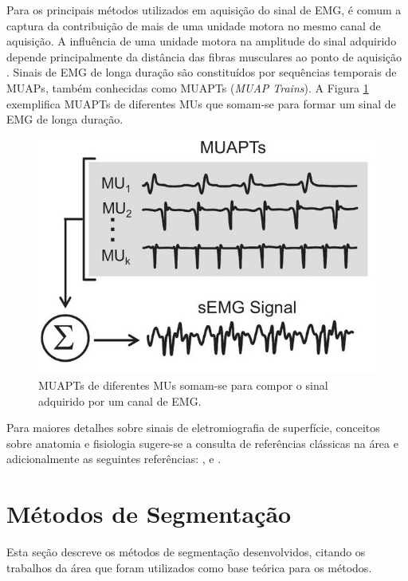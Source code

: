 Para os principais métodos utilizados em aquisição do sinal de EMG, é comum a captura da contribuição de mais de uma unidade motora no mesmo canal de aquisição. A influência de uma unidade motora na amplitude do sinal adquirido depende principalmente da distância das fibras musculares ao ponto de aquisição \cite{Gerdle1999}. Sinais de EMG de longa duração são constituídos por sequências temporais de MUAPs, também conhecidas como MUAPTs (\emph{MUAP Trains}). A Figura \ref{fig_MUAP_trains} exemplifica MUAPTs de diferentes MUs que somam-se para formar um sinal de EMG de longa duração.

\begin{figure}[htb]
	\caption{\label{fig_MUAP_trains}MUAPTs de diferentes MUs somam-se para compor o sinal adquirido por um canal de EMG.}
	\begin{center}
	    \includegraphics[width=0.75\linewidth]{./img/MUAP_trains.jpg}
	\end{center}
\end{figure}

Para maiores detalhes sobre sinais de eletromiografia de superfície, conceitos sobre anatomia e fisiologia sugere-se a consulta de referências clássicas na área e adicionalmente as seguintes referências: ,  e .

		\section{Métodos de Segmentação}
\label{sec:MTDs}
Esta seção descreve os métodos de segmentação desenvolvidos, citando os trabalhos da área que foram utilizados como base teórica para os métodos.

